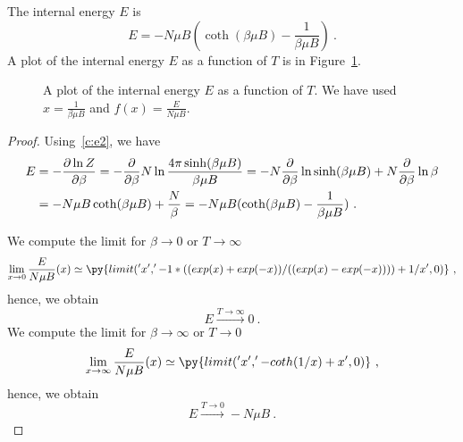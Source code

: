     The internal energy $E$ is 
    \begin{equation*}
        E = - N \mu B (\coth (\beta \mu B) - \frac{1}{\beta \mu B} ) ~.
    \end{equation*}
    A plot of the internal energy $E$ as a function of $T$ is in Figure~\ref{fig:c:magen}.
    \begin{figure}
        \centering
        \caption{A plot of the internal energy $E$ as a function of $T$. We have used $x = \frac{1}{\beta \mu B}$ and $f(x) = \frac{E}{N \mu B}$.}
        \label{fig:c:magen}
    \end{figure}
    \begin{proof}
        Using~\eqref{c:e2}, we have
        \begin{equation*}
        \begin{aligned}
            E & = - \frac{\partial\ln Z}{\partial\beta} = - \frac{\partial}{\partial\beta} N \ln \frac{4 \pi \sinh (\beta \mu B)}{\beta \mu B} = - N \frac{\partial}{\partial\beta} \ln \sinh (\beta \mu B) + N \frac{\partial}{\partial\beta} \ln \beta \\ & = - N \mu B \coth (\beta \mu B) + \frac{N}{\beta} = - N \mu B (\coth (\beta \mu B) - \frac{1}{\beta \mu B} ) ~.
        \end{aligned}
        \end{equation*}

        We compute the limit for $\beta \rightarrow 0$ or $T \rightarrow \infty$
        \begin{equation*}
            \lim_{x \rightarrow 0} \frac{E}{N \mu B} (x) \simeq \py{limit('x', '- 1 * ((exp(x) + exp(-x))/((exp(x) - exp(-x)))) + 1 / x', 0)} ~,
        \end{equation*}
        hence, we obtain
        \begin{equation*}
            E \xrightarrow{T \rightarrow \infty} 0 ~.
        \end{equation*}
        We compute the limit for $\beta \rightarrow \infty$ or $T \rightarrow 0$
        \begin{equation*}
            \lim_{x \rightarrow \infty} \frac{E}{N \mu B} (x) \simeq \py{limit('x', '- coth(1 / x) + x', 0)} ~,
        \end{equation*}
        hence, we obtain
        \begin{equation*}
            E \xrightarrow{T \rightarrow 0} - N \mu B ~.
        \end{equation*}
    \end{proof}
    

